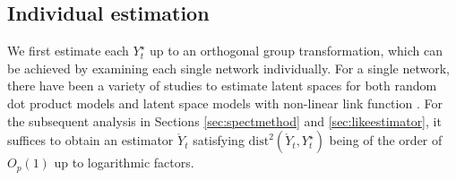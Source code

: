 \documentclass[12pt]{article}
\newcommand{\red}[1]{\textcolor{red}{#1}}
\begin{document}
\subsection{Individual estimation}\label{sec:estimateyt}


We first estimate each $Y_t^{\star}$ up to an  orthogonal group transformation, which  can be achieved by examining each single network individually. 
For a single network, 
there have been a variety of studies to estimate latent spaces for both random dot product models and latent space models with non-linear link function \citep{chatterjee2015matrix,ma2020universal,zhang2020flexible}. 
For the subsequent analysis in Sections \ref{sec:spectmethod} and \ref{sec:likeestimator}, it suffices to obtain an estimator $\mathring{Y}_t$ satisfying $\mathrm{dist}^2(\mathring{Y}_t, Y_t^{\star}) $
being of the order of $ O_p(1)$ up to logarithmic factors. 
\end{document}
